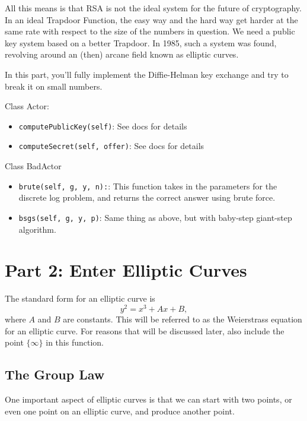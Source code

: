 \documentclass{article}
\begin{document}
\vspace{2mm}
All this means is that RSA is not the ideal system for the future of cryptography. In an ideal Trapdoor Function, the easy way and the hard way get harder at the same rate with respect to the size of the numbers in question. We need a public key system based on a better Trapdoor. In 1985, such a system was found, revolving around an (then) arcane field known as elliptic curves.

\begin{tcolorbox}
    In this part, you'll fully implement the Diffie-Helman key exchange and try to break it on small numbers.

    Class Actor:
    \begin{itemize}
        \item \lstinline{computePublicKey(self)}: See docs for details
        \item \lstinline{computeSecret(self, offer)}: See docs for details
    \end{itemize}

    Class BadActor
    \begin{itemize}
        \item \lstinline{brute(self, g, y, n):}: This function takes in the parameters for the discrete log problem, and returns the correct answer using brute force.
        \item \lstinline{bsgs(self, g, y, p)}: Same thing as above, but with baby-step giant-step algorithm.
    \end{itemize}
\end{tcolorbox}



\section*{Part 2: Enter Elliptic Curves}

The standard form for an elliptic curve is $$y^{2} = x^{3} + Ax + B,$$ where $A$ and $B$ are constants.  This will be referred to as the Weierstrass equation for an elliptic curve. For reasons that will be discussed later, also include the point $\{\infty\}$ in this function.

\subsection*{The Group Law}
    One important aspect of elliptic curves is that we can start with two points, or even one point on an elliptic curve, and produce another point.
\end{document}
